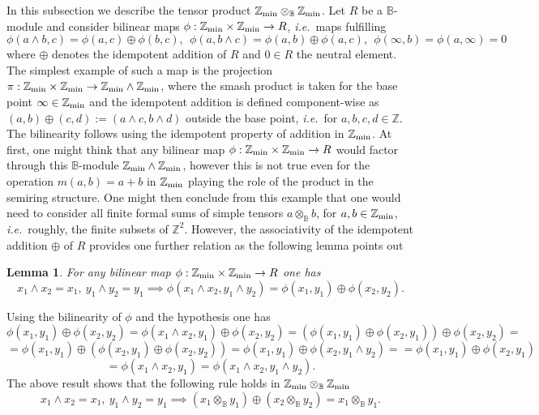 \documentclass[noams,lp]{compositio}
\newtheorem{lem}[thm]{Lemma}
\def\B{{\mathbb B}}
\def\Z{{\mathbb Z}}
\newcommand{\ie}{{\it i.e.\/}\ }
\def\zmin{\Z_{\rm min}}
\begin{document}
In this subsection we describe the  tensor product 
$
\zmin\otimes_\B \zmin
$.
Let $R$ be a $\B$-module and consider bilinear maps $\phi: \zmin\times \zmin\to R$, \ie maps  fulfilling
\begin{equation*}
\phi(a\wedge b,c)=\phi(a,c)\oplus\phi(b,c), \  \  \phi(a, b\wedge c)=\phi(a,b)\oplus\phi(a,c), \  \  \phi(\infty,b)=\phi(a,\infty)=0
\end{equation*}
where  $\oplus$ denotes the idempotent addition of $R$ and $0\in R$ the neutral element. The simplest example of such a map  is the projection $\pi: \zmin\times \zmin\to\zmin\wedge\zmin$, where the smash product is taken for the base point $\infty\in \zmin$ and the idempotent addition is 
defined component-wise as $(a,b)\oplus(c,d):=(a\wedge c, b\wedge d)$ outside the base point, \ie for $a,b,c,d\in\Z$. The bilinearity follows using the idempotent property of addition in $\zmin$. At first, one might think  that any bilinear map $\phi: \zmin\times \zmin\to R$ would factor through this $\B$-module $\zmin\wedge \zmin$, however this is not true even for the operation $m(a,b)= a+b$ in $\zmin$ playing the role of the product in the semiring structure. One might then conclude from this example that one would need to consider all finite formal sums of simple tensors $a \otimes_\B b$, for $a,b\in \zmin$, \ie roughly, the finite subsets of $\Z^2$. However, the associativity of the idempotent addition $\oplus$ of $R$ provides one further relation as the following lemma points out

\begin{lem} \label{assoc} For any bilinear map $\phi: \zmin\times \zmin\to R$  one has 
$$
x_1\wedge x_2=x_1, \  y_1\wedge y_2=y_1\implies \phi(x_1\wedge x_2,y_1\wedge y_2)=\phi(x_1,y_1)\oplus\phi(x_2,y_2).
$$
\end{lem}
\proof Using the bilinearity of $\phi$ and the hypothesis one has
$$
\phi(x_1,y_1)\oplus\phi(x_2,y_2)=\phi(x_1\wedge x_2, y_1)\oplus \phi(x_2,y_2)=\left(\phi(x_1,y_1)\oplus\phi(x_2,y_1)\right)\oplus \phi(x_2,y_2)=
$$
$$
=\phi(x_1,y_1)\oplus\left(\phi(x_2,y_1)\oplus \phi(x_2,y_2)\right)=
\phi(x_1,y_1)\oplus \phi(x_2,y_1\wedge y_2)=
=
\phi(x_1,y_1)\oplus \phi(x_2,y_1)$$
$$=
\phi(x_1\wedge x_2,y_1)=\phi(x_1\wedge x_2,y_1\wedge y_2).
$$ \endproof
The above result  shows that the following rule  holds in $\zmin\otimes_\B \zmin$
\begin{equation}
x_1\wedge x_2=x_1, \  y_1\wedge y_2=y_1\implies (x_1\otimes_\B y_1)\oplus (x_2\otimes_\B y_2)=x_1\otimes_\B y_1.
\end{equation}
\end{document}
